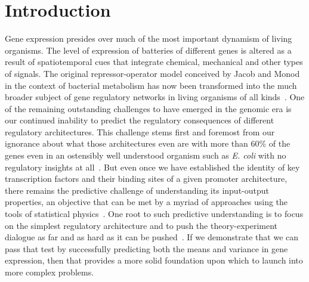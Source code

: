\section{Introduction}

Gene expression presides over much of the most important dynamism of living
organisms.   The level of expression of batteries of different genes is altered
as a result of spatiotemporal cues that integrate chemical, mechanical and other
types of signals.  The original repressor-operator model conceived by Jacob and
Monod in the context of bacterial metabolism has now been transformed into the
much broader subject of gene regulatory networks in living organisms of all
kinds~\cite{Jacob1961, Britten1969, Ben-TabouDe-Leon2007}.  One of the remaining
outstanding challenges to have emerged in the genomic era is our continued
inability to predict the regulatory consequences of different regulatory
architectures. This challenge stems first and foremost from our ignorance about
what those architectures even are with more than 60\% of the genes even in an
ostensibly well understood organism such as  {\it E. coli} with no regulatory
insights at all~\cite{Rydenfelt2014-2,Belliveau2018,Ghatak2019,
Santos_Zavaleta2019}. But even once we have established the identity of key
transcription factors and their binding sites of a given promoter architecture,
there remains the predictive challenge of understanding its input-output
properties, an objective that can be met by a myriad of approaches using the
tools of statistical physics~\cite{Ackers1982, Shea1985,
Buchler2003,Vilar2003a,Vilar2003b, Bintu2005a,Bintu2005c, Gertz2009,Sherman2012,
Saiz2013, Ko1991,Peccoud1995,Record1996, Kepler2001,
Sanchez2008,Shahrezaei2008,Sanchez2011, Michel2010}.  One root to such
predictive understanding is to focus on the simplest regulatory architecture and
to push the theory-experiment dialogue as far and as hard as it can be
pushed~\cite{Phillips2019}.  If we demonstrate that we can pass that test by
successfully predicting both the means and variance in gene expression, then
that provides a more solid foundation upon which to launch into more complex
problems.

